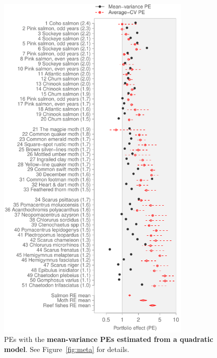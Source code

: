 \begin{figure}[htbp]
  \centering
  \includegraphics[height=6.8in]{prophets/PE_comparison_z_meta_taxa_quad_20121214.pdf}
  \caption[PEs with the mean-variance PEs estimated from a quadratic model.]{
    PEs with the \textbf{mean-variance PEs estimated from a quadratic model}.
    See Figure~\ref{fig:meta} for details.
}
\label{fig:meta-quad}
\end{figure}

